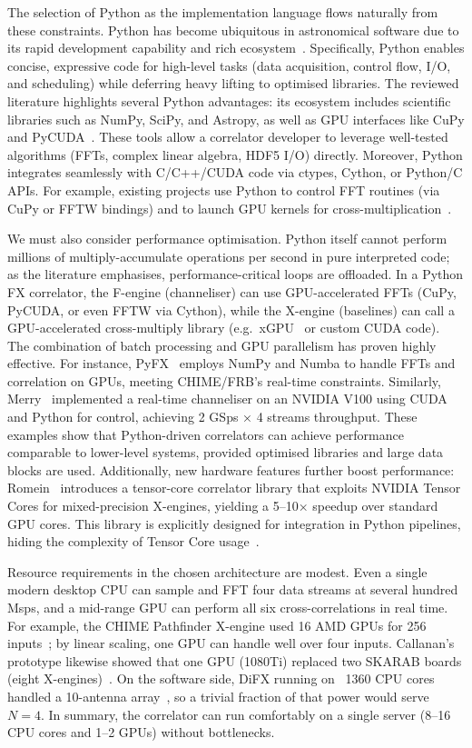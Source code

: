 The selection of Python as the implementation language flows naturally from these constraints. Python has become ubiquitous in astronomical software due to its rapid development capability and rich ecosystem~\cite{Gorthi2021}. Specifically, Python enables concise, expressive code for high-level tasks (data acquisition, control flow, I/O, and scheduling) while deferring heavy lifting to optimised libraries. The reviewed literature highlights several Python advantages: its ecosystem includes scientific libraries such as NumPy, SciPy, and Astropy, as well as GPU interfaces like CuPy and PyCUDA~\cite{Merry2023, Gorthi2021}. These tools allow a correlator developer to leverage well-tested algorithms (FFTs, complex linear algebra, HDF5 I/O) directly. Moreover, Python integrates seamlessly with C/C++/CUDA code via ctypes, Cython, or Python/C APIs. For example, existing projects use Python to control FFT routines (via CuPy or FFTW bindings) and to launch GPU kernels for cross-multiplication~\cite{Romein2021, Callanan2020}.

We must also consider performance optimisation. Python itself cannot perform millions of multiply-accumulate operations per second in pure interpreted code; as the literature emphasises, performance-critical loops are offloaded. In a Python FX correlator, the F-engine (channeliser) can use GPU-accelerated FFTs (CuPy, PyCUDA, or even FFTW via Cython), while the X-engine (baselines) can call a GPU-accelerated cross-multiply library (e.g.\ xGPU~\cite{Callanan2020} or custom CUDA code). The combination of batch processing and GPU parallelism has proven highly effective. For instance, PyFX~\cite{Leung2024} employs NumPy and Numba to handle FFTs and correlation on GPUs, meeting CHIME/FRB’s real-time constraints. Similarly, Merry~\cite{Merry2023} implemented a real-time channeliser on an NVIDIA V100 using CUDA and Python for control, achieving 2 GSps × 4 streams throughput. These examples show that Python-driven correlators can achieve performance comparable to lower-level systems, provided optimised libraries and large data blocks are used. Additionally, new hardware features further boost performance: Romein~\cite{Romein2021} introduces a tensor-core correlator library that exploits NVIDIA Tensor Cores for mixed-precision X-engines, yielding a 5–10× speedup over standard GPU cores. This library is explicitly designed for integration in Python pipelines, hiding the complexity of Tensor Core usage~\cite{Romein2021}.

Resource requirements in the chosen architecture are modest. Even a single modern desktop CPU can sample and FFT four data streams at several hundred Msps, and a mid-range GPU can perform all six cross-correlations in real time. For example, the CHIME Pathfinder X-engine used 16 AMD GPUs for 256 inputs~\cite{Denman2015}; by linear scaling, one GPU can handle well over four inputs. Callanan’s prototype likewise showed that one GPU (1080Ti) replaced two SKARAB boards (eight X-engines)~\cite{Callanan2020}. On the software side, DiFX running on ~1360 CPU cores handled a 10-antenna array~\cite{Deller2011}, so a trivial fraction of that power would serve \( N = 4 \). In summary, the correlator can run comfortably on a single server (8–16 CPU cores and 1–2 GPUs) without bottlenecks.

